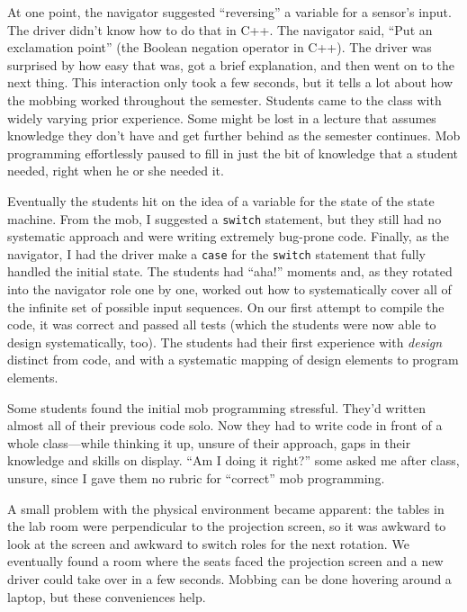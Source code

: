 \documentclass{article}
\begin{document}
At one point, the navigator suggested ``reversing'' a variable for a sensor's
input. The driver didn't know how to do that in C++. The navigator said, ``Put
an exclamation point'' (the Boolean negation operator in C++). The driver was
surprised by how easy that was, got a brief explanation, and then went on to
the next thing. This interaction only took a few seconds, but it tells a lot
about how the mobbing worked throughout the semester. Students came to the
class with widely varying prior experience. Some might be lost in a lecture
that assumes knowledge they don't have and get further behind as the semester
continues. Mob programming effortlessly paused to fill in just the bit of
knowledge that a student needed, right when he or she needed it.


Eventually the students hit on the idea of a variable for the state of the
state machine. From the mob, I suggested a \texttt{switch} statement,
but they still had no systematic approach and were writing
extremely bug-prone code. Finally, as the navigator, I had the driver make a
\texttt{case} for the \texttt{switch} statement that fully handled the initial
state.  The students had ``aha!'' moments and, as they rotated into the
navigator role one by one, worked out how to systematically cover all of the
infinite set of possible input sequences. On our first attempt to compile the
code, it was correct and passed all tests (which the students were now able to
design systematically, too). The students had their first experience with
\emph{design} distinct from code, and with a systematic mapping of design
elements to program elements.

Some students found the initial mob programming stressful. They'd written
almost all of their previous code solo. Now they had to write code in front of
a whole class---while thinking it up, unsure of their approach, gaps in their
knowledge and skills on display. ``Am I doing it right?'' some asked me after
class, unsure, since I gave them no rubric for ``correct'' mob programming.

A small problem with the physical environment became apparent: the tables in
the lab room were perpendicular to the projection screen, so it was awkward to
look at the screen and awkward to switch roles for the next rotation. We
eventually found a room where the seats faced the projection screen and a new
driver could take over in a few seconds.  Mobbing can be done hovering around
a laptop, but these conveniences help.
\end{document}
